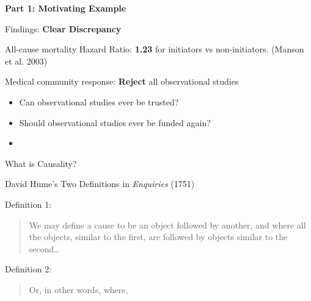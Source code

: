 \documentclass[
  ignorenonframetext,
  aspectratio=169,
]{beamer}
\begin{document}
\begin{frame}{\textbf{Part 1: Motivating Example}}
\begin{block}{Findings: \textbf{Clear Discrepancy}}
\label{findings-clear-discrepancy}
\begin{tcolorbox}[enhanced jigsaw, coltitle=black, left=2mm, colback=white, rightrule=.15mm, colframe=quarto-callout-warning-color-frame, opacitybacktitle=0.6, arc=.35mm, colbacktitle=quarto-callout-warning-color!10!white, toprule=.15mm, bottomtitle=1mm, breakable, toptitle=1mm, opacityback=0, titlerule=0mm, title={Experimental Findings: \textbf{opposite of observational findings}}, bottomrule=.15mm, leftrule=.75mm]

All-cause mortality Hazard Ratio: \textbf{1.23} for initiators vs
non-initiators. (Manson et al. 2003)

\end{tcolorbox}
\end{block}

\begin{block}{Medical community response: \textbf{Reject} all
observational studies}
\label{medical-community-response-reject-all-observational-studies}
\begin{itemize}
\item
  Can observational studies ever be trusted?
\item
  Should observational studies ever be funded again?
\item
  \color{cyan}{What went wrong?}
\end{itemize}
\end{block}

\begin{block}{What is Causality?}
\label{what-is-causality}
\end{block}

\begin{block}{David Hume's Two Definitions in \emph{Enquiries} (1751)}
\label{david-humes-two-definitions-in-enquiries-1751}
\begin{block}{Definition 1:}
\label{definition-1}
\begin{quote}
We may define a cause to be an object followed by another, and where all
the objects, similar to the first, are followed by objects similar to
the second\ldots{}
\end{quote}
\end{block}

\begin{block}{Definition 2:}
\label{definition-2}
\begin{quote}
Or, in other words, where,
\color{cyan}{if the first object had not been, the second never would have existed}
\end{quote}


\end{block}
\end{block}
\end{frame}
\end{document}
